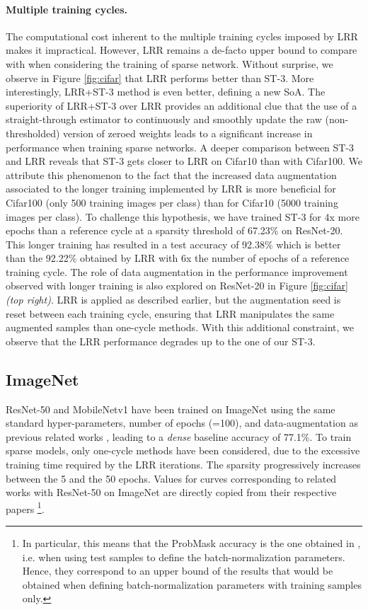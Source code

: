 \documentclass[10pt,twocolumn,letterpaper]{article}
\begin{document}
\paragraph{Multiple training cycles.} The computational cost inherent to the multiple training cycles imposed by LRR makes it impractical. However, LRR remains a de-facto upper bound to compare with when considering the training of sparse network. Without surprise, we observe in Figure \ref{fig:cifar} that LRR performs better than ST-3. More interestingly, LRR+ST-3 method is even better, defining a new SoA. The superiority of LRR+ST-3 over LRR provides an additional clue that the use of a straight-through estimator to continuously and smoothly update the raw (non-thresholded) version of zeroed weights leads to a significant increase in performance when training sparse networks. A deeper comparison between ST-3 and LRR reveals that ST-3 gets closer to LRR on Cifar10 than with Cifar100. We attribute this phenomenon to the fact that the increased data augmentation associated to the longer training implemented  by LRR is more beneficial for Cifar100 (only 500 training images per class) than for Cifar10 (5000 training images per class). To challenge this hypothesis, we have trained ST-3 for 4x more epochs than a reference cycle at a sparsity threshold of 67.23\% on ResNet-20. This longer training has resulted in a test accuracy of 92.38\% which is better than the 92.22\% obtained by LRR with 6x the number of epochs of a reference training cycle.  The role of data augmentation in the performance improvement observed with longer training is also explored on ResNet-20 in Figure \ref{fig:cifar} \textit{(top right)}. LRR is applied as described earlier, but the augmentation seed is reset between each training cycle, ensuring that LRR manipulates the same augmented samples than one-cycle methods. With this additional constraint, we observe that the LRR performance degrades up to the one of our ST-3.




\subsection{ImageNet}\label{sec:imagenet}
ResNet-50 \cite{He2015} and MobileNetv1 \cite{howard2017mobilenets} have been trained on ImageNet \cite{deng2009imagenet} using the same standard hyper-parameters, number of epochs (=100), and data-augmentation as previous related works \cite{Evci2020,Kusupati2020,Zhou2021,Liu2021}, leading to a \emph{dense} baseline accuracy of 77.1\%. To train sparse models, only one-cycle methods have been considered, due to the excessive training time required by the LRR iterations. The sparsity progressively increases between the 5 and the 50 epochs. Values for curves corresponding to related works with ResNet-50 on ImageNet are directly copied from their respective papers \footnote{In particular, this means that the ProbMask accuracy is the one obtained in \cite{Zhou2021}, i.e. when using test samples to define the batch-normalization parameters. Hence, they correspond to an upper bound of the results that would be obtained when defining batch-normalization parameters with training samples only. }. 
\end{document}
